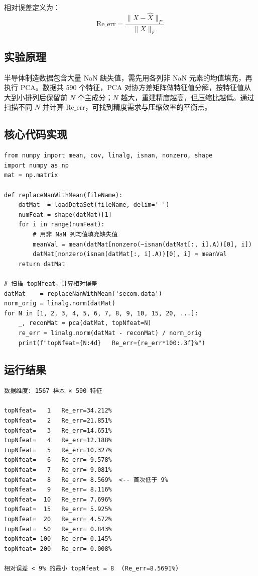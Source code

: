 \documentclass[10.5pt]{config}
\begin{document}
相对误差定义为：
$$\text{Re\_err} = \frac{\|X - \hat{X}\|_F}{\|X\|_F}$$

\subsection{实验原理}
半导体制造数据包含大量 NaN 缺失值，需先用各列非 NaN 元素的均值填充，再执行 PCA。数据共 590 个特征，PCA 对协方差矩阵做特征值分解，按特征值从大到小排列后保留前 $N$ 个主成分；$N$ 越大，重建精度越高，但压缩比越低。通过扫描不同 $N$ 并计算 $\text{Re\_err}$，可找到精度需求与压缩效率的平衡点。

\subsection{核心代码实现}
\begin{listing}[H]
\begin{verbatim}
from numpy import mean, cov, linalg, isnan, nonzero, shape
import numpy as np
mat = np.matrix

def replaceNanWithMean(fileName):
    datMat  = loadDataSet(fileName, delim=' ')
    numFeat = shape(datMat)[1]
    for i in range(numFeat):
        # 用非 NaN 列均值填充缺失值
        meanVal = mean(datMat[nonzero(~isnan(datMat[:, i].A))[0], i])
        datMat[nonzero(isnan(datMat[:, i].A))[0], i] = meanVal
    return datMat

# 扫描 topNfeat，计算相对误差
datMat    = replaceNanWithMean('secom.data')
norm_orig = linalg.norm(datMat)
for N in [1, 2, 3, 4, 5, 6, 7, 8, 9, 10, 15, 20, ...]:
    _, reconMat = pca(datMat, topNfeat=N)
    re_err = linalg.norm(datMat - reconMat) / norm_orig
    print(f"topNfeat={N:4d}   Re_err={re_err*100:.3f}%")
\end{verbatim}
\caption{实验 3-2 核心代码——NaN 填充与相对误差扫描}
\end{listing}

\subsection{运行结果}

\begin{lstlisting}[language={}, numbers=none, frame=single, backgroundcolor=\color{codebg}, basicstyle=\ttfamily\footnotesize, breaklines=true]
数据维度: 1567 样本 × 590 特征

topNfeat=   1   Re_err=34.212%
topNfeat=   2   Re_err=21.851%
topNfeat=   3   Re_err=14.651%
topNfeat=   4   Re_err=12.188%
topNfeat=   5   Re_err=10.327%
topNfeat=   6   Re_err= 9.578%
topNfeat=   7   Re_err= 9.081%
topNfeat=   8   Re_err= 8.569%  <-- 首次低于 9%
topNfeat=   9   Re_err= 8.116%
topNfeat=  10   Re_err= 7.696%
topNfeat=  15   Re_err= 5.925%
topNfeat=  20   Re_err= 4.572%
topNfeat=  50   Re_err= 0.843%
topNfeat= 100   Re_err= 0.145%
topNfeat= 200   Re_err= 0.008%

相对误差 < 9% 的最小 topNfeat = 8  (Re_err=8.5691%)
\end{lstlisting}
\end{document}
